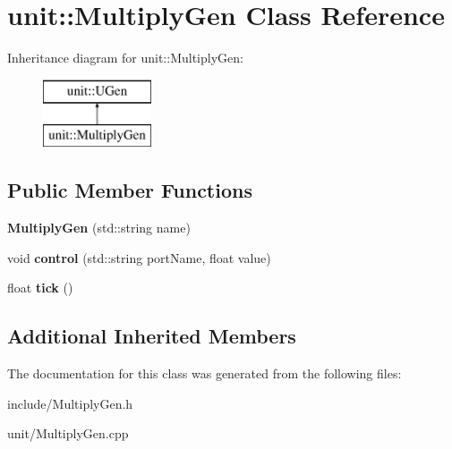 \hypertarget{classunit_1_1MultiplyGen}{}\section{unit\+:\+:Multiply\+Gen Class Reference}
\label{classunit_1_1MultiplyGen}
Inheritance diagram for unit\+:\+:Multiply\+Gen\+:\begin{figure}[H]
\begin{center}
\leavevmode
\includegraphics[height=2.000000cm]{classunit_1_1MultiplyGen}
\end{center}
\end{figure}
\subsection*{Public Member Functions}
\begin{DoxyCompactItemize}
\item 
{\bfseries Multiply\+Gen} (std\+::string name)\hypertarget{classunit_1_1MultiplyGen_a8c63aba9e9be634e03f900182b4a1d7a}{}\label{classunit_1_1MultiplyGen_a8c63aba9e9be634e03f900182b4a1d7a}

\item 
void {\bfseries control} (std\+::string port\+Name, float value)\hypertarget{classunit_1_1MultiplyGen_a399981309ef24f24c7044172e58c1e8a}{}\label{classunit_1_1MultiplyGen_a399981309ef24f24c7044172e58c1e8a}

\item 
float {\bfseries tick} ()\hypertarget{classunit_1_1MultiplyGen_abeeb8a84f91375454120639a9bb810fb}{}\label{classunit_1_1MultiplyGen_abeeb8a84f91375454120639a9bb810fb}

\end{DoxyCompactItemize}
\subsection*{Additional Inherited Members}


The documentation for this class was generated from the following files\+:\begin{DoxyCompactItemize}
\item 
include/Multiply\+Gen.\+h\item 
unit/Multiply\+Gen.\+cpp\end{DoxyCompactItemize}
